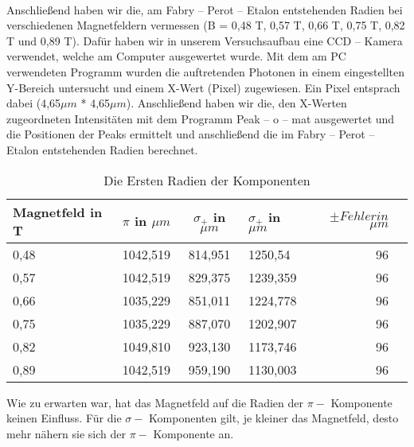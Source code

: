 \documentclass[10pt,a4paper]{article}
\begin{document}
\\
Anschließend haben wir die, am Fabry – Perot – Etalon entstehenden Radien bei verschiedenen Magnetfeldern vermessen (B = 0,48 T, 0,57 T,  0,66 T,  0,75 T, 0,82 T und 0,89 T). Dafür haben wir in unserem Versuchsaufbau eine CCD – Kamera verwendet, welche am Computer ausgewertet wurde. Mit dem am PC verwendeten Programm wurden die auftretenden Photonen in einem eingestellten Y-Bereich untersucht und einem X-Wert (Pixel) zugewiesen. Ein Pixel entsprach dabei (4,65$\mu m$  * 4,65$\mu m$). Anschließend haben wir die, den X-Werten zugeordneten Intensitäten mit dem Programm Peak – o – mat ausgewertet und die Positionen der Peaks ermittelt und anschließend die im Fabry – Perot – Etalon entstehenden Radien berechnet.

\begin{table}[h!]
	\centering
	\begin{tabular}{|l|r|c|lrp{16cm}}\hline
		Magnetfeld in T & $\pi $ in $\mu m$  & $\sigma_{+}$ in $\mu m$ & $\sigma_{+}$ in $\mu m$ & $\pm Fehler in $$\mu m $\\\hline
		0,48 & 1042,519 & 814,951 & 1250,54 & 96	\\
		0,57 & 1042,519 & 829,375 &1239,359 & 96	\\
		0,66 & 1035,229 & 851,011 &1224,778 & 96	\\
		0,75 & 1035,229 & 887,070 &1202,907 & 96    \\
		0,82 & 1049,810 & 923,130 &1173,746 & 96	\\
		0,89 & 1042,519 & 959,190 &1130,003 & 96    \\\hline
		
	\end{tabular}
	\caption{Die Ersten Radien der Komponenten}
	\label{spektrum2}
\end{table}


Wie zu erwarten war, hat das Magnetfeld auf die Radien der $\pi - $ Komponente keinen Einfluss. Für die $\sigma - $ Komponenten gilt, je kleiner das Magnetfeld, desto mehr nähern sie sich der $\pi - $ Komponente an.
\end{document}
